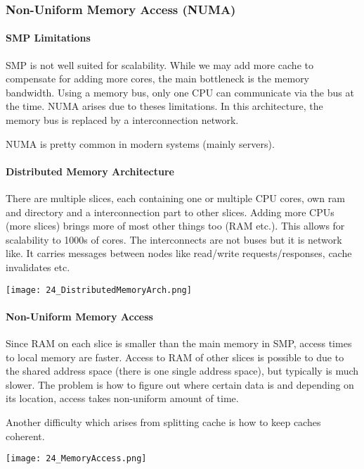 

\subsubsection{Non-Uniform Memory Access (NUMA)}
\paragraph{SMP Limitations}
SMP is not well suited for scalability. While we may add more cache to compensate for adding more cores, the main bottleneck is the memory bandwidth. Using a memory bus, only one CPU can communicate via the bus at the time. NUMA arises due to theses limitations. In this architecture, the memory bus is replaced by a interconnection network.

NUMA is pretty common in modern systems (mainly servers).

\paragraph{Distributed Memory Architecture}
There are multiple slices, each containing one or multiple CPU cores, own ram and directory and a interconnection part to other slices. Adding more CPUs (more slices) brings more of most other things too (RAM etc.). This allows for scalability to 1000s of cores. The interconnects are not buses but it is network like. It carries messages between nodes like read/write requests/responses, cache invalidates etc.

\texttt{[image: 24\_DistributedMemoryArch.png]}

\paragraph{Non-Uniform Memory Access}
Since RAM on each slice is smaller than the main memory in SMP, access times to local memory are faster. Access to RAM of other slices is possible to due to the shared address space (there is one single address space), but typically is much slower. The problem is how to figure out where certain data is and depending on its location, access takes non-uniform amount of time.

Another difficulty which arises from splitting cache is how to keep caches coherent.

\texttt{[image: 24\_MemoryAccess.png]}

